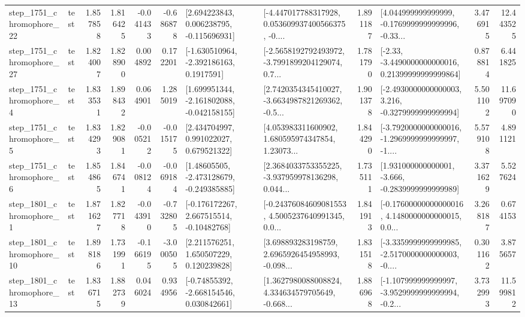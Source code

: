 \begin{tabular}{llrrrrllrlrr}
 step\_1751\_chromophore\_22 &      test &      1.857858 &    1.816425 &     -0.041433 & -0.686878 &    [2.694223843, 0.006238795, -0.115696931] &  [-4.447017788317928, 0.053609937400566375, -0.... &       1.891187 &  [4.044999999999999, -0.1769999999999996, -0.33... &            3.476915 &         12.443525 \\
 step\_1751\_chromophore\_27 &      test &      1.824007 &    1.828900 &      0.004892 &  0.172201 &     [-1.630510964, -2.392186163, 0.1917591] &  [-2.5658192792493972, -3.7991899204129074, 0.7... &       1.781790 &  [-2.33, -3.4490000000000016, 0.21399999999999864] &            0.878814 &          6.441825 \\
  step\_1751\_chromophore\_4 &      test &      1.833531 &    1.898432 &      0.064901 &  1.285019 &   [1.699951344, -2.161802088, -0.042158155] &  [2.7420354345410027, -3.6634987821269362, -0.5... &       1.901378 &  [-2.4930000000000003, 3.216, -0.3279999999999994] &            5.501102 &         11.697090 \\
  step\_1751\_chromophore\_5 &      test &      1.834293 &    1.829081 &     -0.005212 & -0.015175 &     [2.434704997, 0.991022027, 0.679521322] &  [4.053983311600902, 1.680595974347854, 1.23073... &       1.844290 &  [-3.7920000000000016, -1.2969999999999997, -1.... &            5.579108 &          4.891121 \\
  step\_1751\_chromophore\_6 &      test &      1.854865 &    1.846741 &     -0.008124 & -0.069184 &    [1.48605505, -2.473128679, -0.249385885] &  [2.3684033753355225, -3.937959978136298, 0.044... &       1.735111 &   [1.931000000000001, -3.666, -0.2839999999999989] &            3.371629 &          5.527624 \\
  step\_1801\_chromophore\_1 &      test &      1.871627 &    1.827718 &     -0.043910 & -0.732805 &    [-0.176172267, 2.667515514, -0.10482768] &  [-0.24376084609081553, 4.5005237640991345, 0.0... &       1.841913 &  [-0.17600000000000016, 4.1480000000000015, 0.0... &            3.268187 &          0.674153 \\
 step\_1801\_chromophore\_10 &      test &      1.898186 &    1.731991 &     -0.166195 & -3.000505 &     [2.211576251, 1.650507229, 0.120239828] &  [3.698893283198759, 2.6965926454958993, -0.098... &       1.831518 &  [-3.3359999999999985, -2.5170000000000003, -0.... &            0.301162 &          3.875657 \\
 step\_1801\_chromophore\_13 &      test &      1.836715 &    1.882739 &      0.046024 &  0.934956 &    [-0.74855392, -2.668154546, 0.030842661] &  [1.3627980088008824, 4.334634579705649, -0.668... &       1.886968 &  [-1.107999999999997, -3.9529999999999994, -0.2... &            3.732993 &         11.599812 \\

\end{tabular}
